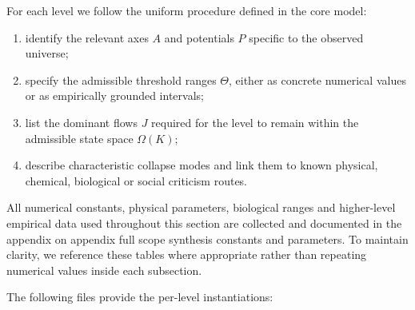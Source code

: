 For each level we follow the uniform procedure defined in the core model:
\begin{enumerate}
    \item identify the relevant axes \(A\) and potentials \(P\) specific
          to the observed universe;
    \item specify the admissible threshold ranges \(\Theta\), either as
          concrete numerical values or as empirically grounded intervals;
    \item list the dominant flows \(J\) required for the level to remain
          within the admissible state space \(\Omega(K)\);
    \item describe characteristic collapse modes and link them to known
          physical, chemical, biological or social criticism routes.
\end{enumerate}

All numerical constants, physical parameters, biological ranges and
higher-level empirical data used throughout this section are collected
and documented in the appendix on appendix full scope synthesis constants and parameters.
To maintain clarity, we reference these tables where appropriate rather
than repeating numerical values inside each subsection.

The following files provide the per-level instantiations:














